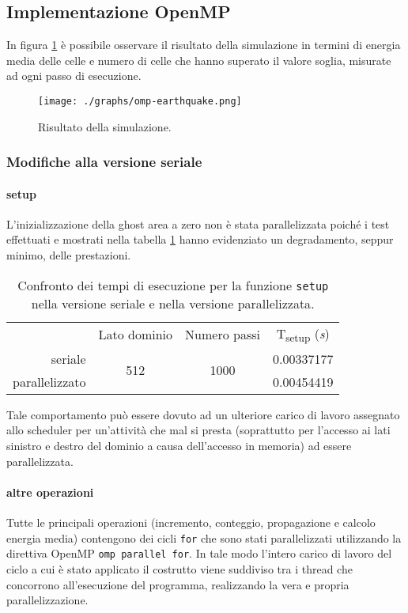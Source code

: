 \subsection{Implementazione OpenMP}

In figura \ref{fig:simulation1} è possibile osservare il risultato della
simulazione in termini di energia media delle celle e numero di celle che hanno
superato il valore soglia, misurate ad ogni passo di esecuzione.

\begin{figure}[!ht]
  \centering
  \texttt{[image: ./graphs/omp-earthquake.png]}
  \caption{Risultato della simulazione.}\label{fig:simulation1}
\end{figure}

\subsubsection{Modifiche alla versione seriale}

\paragraph{setup}L'inizializzazione della ghost area a zero non è stata
parallelizzata poiché i test effettuati e mostrati nella tabella
\ref{tab:parallelghostarea} hanno evidenziato un degradamento, seppur minimo,
delle prestazioni.

\begin{table}[ht]
\centering
\begin{tabular}{rccc}
\cmidrule[\heavyrulewidth]{2-4}
 & Lato dominio & Numero passi & T\textsubscript{setup} (\textit{s})\\
 \cmidrule[\lightrulewidth]{2-4}
 seriale & \multirow{2}{*}{512} & \multirow{2}{*}{1000} & 0.00337177\\
 parallelizzato &&& 0.00454419\\
\cmidrule[\heavyrulewidth]{2-4}
\end{tabular}
\caption{\label{tab:parallelghostarea}Confronto dei tempi di esecuzione per la
funzione \texttt{setup} nella versione seriale e nella versione parallelizzata.}
\end{table}

Tale comportamento può essere dovuto ad un ulteriore carico di lavoro assegnato
allo scheduler per un'attività che mal si presta (soprattutto per l'accesso ai
lati sinistro e destro del dominio a causa dell'accesso in memoria) ad essere
parallelizzata.

\paragraph{altre operazioni}
Tutte le principali operazioni (incremento, conteggio, propagazione e calcolo
energia media) contengono dei cicli \texttt{for} che sono stati parallelizzati
utilizzando la direttiva OpenMP \texttt{omp parallel for}.  In tale modo
l'intero carico di lavoro del ciclo a cui è stato applicato il costrutto viene
suddiviso tra i thread che concorrono all'esecuzione del programma, realizzando
la vera e propria parallelizzazione.

